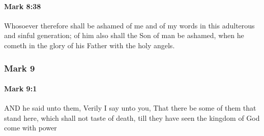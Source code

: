 		\paragraph{Mark 8:38} %
			\label{MARK-8-38}

			Whosoever therefore shall be ashamed of me and of my words in this adulterous and sinful generation; of him also shall the Son of man be ashamed, when he cometh in the glory of his Father with the holy angels.

			\begin{framed}
			\scriptsize
				\begin{compactdesc}
					\item[SBLG] 
				\end{compactdesc}
			\end{framed}

	\subsubsection{Mark 9} %
		\label{MARK-9}
		
		\paragraph{Mark 9:1} %
			\label{MARK-9-1}

			AND he said unto them, Verily I say unto you, That there be some of them that stand here, which shall not taste of death, till they have seen the kingdom of God come with power

